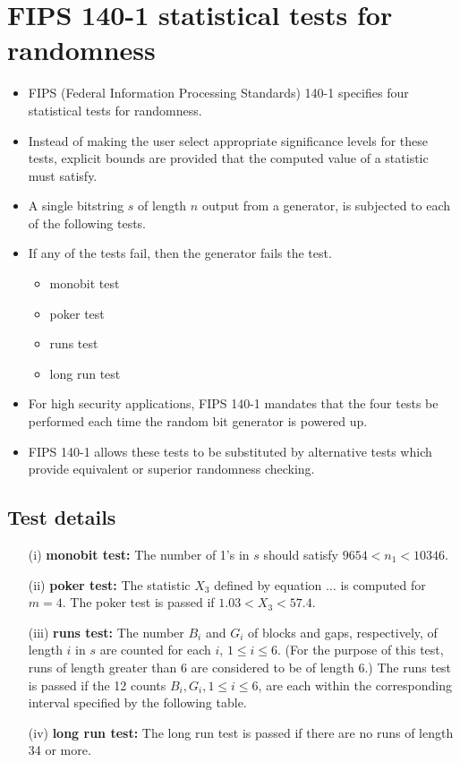 \documentclass[12pt,openany]{book}
\theoremstyle{definition}
\begin{document}
\section*{FIPS 140-1 statistical tests for randomness}
\begin{itemize}
	\item FIPS (Federal Information Processing Standards) 140-1 specifies four statistical tests for randomness.
	\item Instead of making the user select appropriate significance levels for these tests, explicit bounds are provided that the computed value of a statistic must satisfy.
	\item A single bitstring \( s \) of length \( n \) output from a generator, is subjected to each of the following tests.
	\item If any of the tests fail, then the generator fails the test.
	\begin{itemize}
		\item monobit test
		\item poker test
		\item runs test
		\item long run test
	\end{itemize}
	\item For high security applications, FIPS 140-1 mandates that the four tests be performed each time the random bit generator is powered up.
	\item FIPS 140-1 allows these tests to be substituted by alternative tests which provide equivalent or superior randomness checking.
\end{itemize}

\subsection*{Test details}
\begin{enumerate}
	\item[(i)] \textbf{monobit test:} The number of 1's in \( s \) should satisfy \( 9654 < n_1 < 10346 \).
	\item[(ii)] \textbf{poker test:} The statistic \( X_3 \) defined by equation \( \ldots \) is computed for \( m = 4 \). The poker test is passed if \( 1.03 < X_3 < 57.4 \).
	\item[(iii)] \textbf{runs test:} The number \( B_i \) and \( G_i \) of blocks and gaps, respectively, of length \( i \) in \( s \) are counted for each \( i \), \( 1 \leq i \leq 6 \). (For the purpose of this test, runs of length greater than 6 are considered to be of length 6.) The runs test is passed if the 12 counts \( B_i, G_i, 1 \leq i \leq 6 \), are each within the corresponding interval specified by the following table.
	\item[(iv)] \textbf{long run test:} The long run test is passed if there are no runs of length 34 or more.
\end{enumerate}
\end{document}

